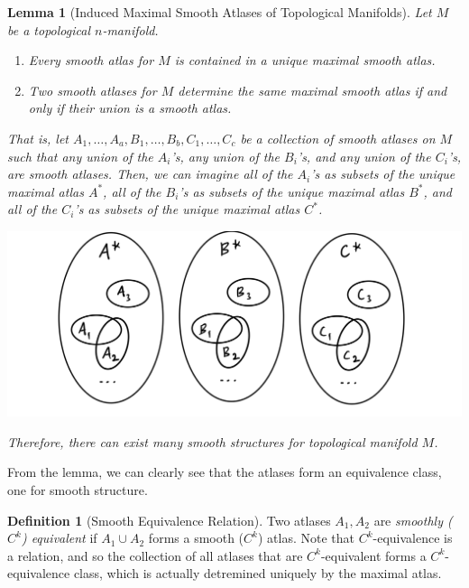 \documentclass{article}
\newtheorem{lemma}[theorem]{Lemma}
\theoremstyle{remark}
\theoremstyle{definition}
\newtheorem{definition}{Definition}[section]
\begin{document}
    \begin{lemma}[Induced Maximal Smooth Atlases of Topological Manifolds]
      Let $M$ be a topological $n$-manifold. 
      \begin{enumerate}
        \item Every smooth atlas for $M$ is contained in a unique maximal smooth atlas. 
        \item Two smooth atlases for $M$ determine the same maximal smooth atlas if and only if their union is a smooth atlas. 
      \end{enumerate}
      That is, let $A_1, \ldots, A_a, B_1, \ldots, B_b, C_1, \ldots, C_c$ be a collection of smooth atlases on $M$ such that any union of the $A_i$'s, any union of the $B_i$'s, and any union of the $C_i$'s, are smooth atlases. Then, we can imagine all of the $A_i$'s as subsets of the unique maximal atlas $A^*$, all of the $B_i$'s as subsets of the unique maximal atlas $B^*$, and all of the $C_i$'s as subsets of the unique maximal atlas $C^*$. 
      \begin{center}
        \includegraphics[scale=0.25]{img/Maximal_Smooth_Atlas_Classes.PNG}
      \end{center}
      Therefore, there can exist many smooth structures for topological manifold $M$. 
    \end{lemma}

    From the lemma, we can clearly see that the atlases form an equivalence class, one for smooth structure. 

    \begin{definition}[Smooth Equivalence Relation]
      Two atlases $A_1, A_2$ are \textit{smoothly ($C^k$) equivalent} if $A_1 \cup A_2$ forms a smooth ($C^k$) atlas. Note that $C^k$-equivalence is a relation, and so the collection of all atlases that are $C^k$-equivalent forms a $C^k$-equivalence class, which is actually detremined uniquely by the maximal atlas. 
    \end{definition}
\end{document}
